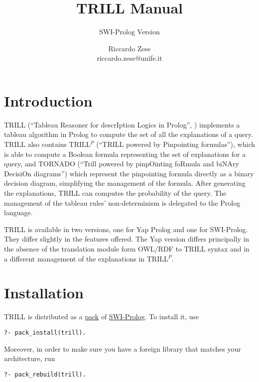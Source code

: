 \documentclass[a4paper,10pt]{scrartcl}
\begin{document}
\title{TRILL Manual}

\subtitle{SWI-Prolog Version}

\author{Riccardo Zese\\
riccardo.zese@unife.it}

\maketitle


\section{Introduction}


TRILL (``Tableau Reasoner for descrIption Logics in Prolog'', \cite{ZesBelRig16-AMAI-IJ,Zese17-SSW-BK}) implements a tableau algorithm in
Prolog to compute the set of all the explanations of a query. 
TRILL also contains TRILL$^P$ (``TRILL powered by Pinpointing formulas''), which is able to compute a Boolean formula representing the set of explanations for a query, and 
TORNADO (``Trill powered by pinpOinting foRmula and biNAry DecisiOn diagrams'') which represent the pinpointing formula directly as a binary decision diagram, simplifying the management of the formula.
After generating the explanations, 
TRILL can computes the probability of the query. The management of the tableau rules' non-determinism is delegated to the Prolog language.

TRILL is available in two versions, one for Yap Prolog and one for SWI-Prolog. They differ slightly in the features offered.
The Yap version differs principally in the absence of the translation module form OWL/RDF to TRILL syntax and in a different management of the explanations in TRILL$^P$.

\section{Installation}
TRILL is distributed as a \href{http://www.swi-prolog.org/pack/list?p=trill}{pack} of \href{http://www.swi-prolog.org/}{SWI-Prolog}. To install it, use
\begin{verbatim}
?- pack_install(trill).
\end{verbatim}
Moreover, in order to make sure you have a foreign library that matches your architecture, run
\begin{verbatim}
?- pack_rebuild(trill). 
\end{verbatim}






\end{document}

